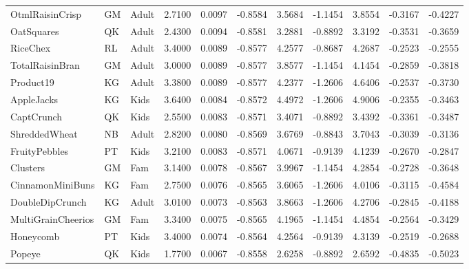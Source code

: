 \begin{table}[!htbp]
\begin{tabular}{lllrrrrrrrr}
OtmlRaisinCrisp & GM & Adult & 2.7100 & 0.0097 & -0.8584 & 3.5684 & -1.1454 & 3.8554 & -0.3167 & -0.4227 \\
OatSquares & QK & Adult & 2.4300 & 0.0094 & -0.8581 & 3.2881 & -0.8892 & 3.3192 & -0.3531 & -0.3659 \\
RiceChex & RL & Adult & 3.4000 & 0.0089 & -0.8577 & 4.2577 & -0.8687 & 4.2687 & -0.2523 & -0.2555 \\
TotalRaisinBran & GM & Adult & 3.0000 & 0.0089 & -0.8577 & 3.8577 & -1.1454 & 4.1454 & -0.2859 & -0.3818 \\
Product19 & KG & Adult & 3.3800 & 0.0089 & -0.8577 & 4.2377 & -1.2606 & 4.6406 & -0.2537 & -0.3730 \\
AppleJacks & KG & Kids & 3.6400 & 0.0084 & -0.8572 & 4.4972 & -1.2606 & 4.9006 & -0.2355 & -0.3463 \\
CaptCrunch & QK & Kids & 2.5500 & 0.0083 & -0.8571 & 3.4071 & -0.8892 & 3.4392 & -0.3361 & -0.3487 \\
ShreddedWheat & NB & Adult & 2.8200 & 0.0080 & -0.8569 & 3.6769 & -0.8843 & 3.7043 & -0.3039 & -0.3136 \\
FruityPebbles & PT & Kids & 3.2100 & 0.0083 & -0.8571 & 4.0671 & -0.9139 & 4.1239 & -0.2670 & -0.2847 \\
Clusters & GM & Fam & 3.1400 & 0.0078 & -0.8567 & 3.9967 & -1.1454 & 4.2854 & -0.2728 & -0.3648 \\
CinnamonMiniBuns & KG & Fam & 2.7500 & 0.0076 & -0.8565 & 3.6065 & -1.2606 & 4.0106 & -0.3115 & -0.4584 \\
DoubleDipCrunch & KG & Adult & 3.0100 & 0.0073 & -0.8563 & 3.8663 & -1.2606 & 4.2706 & -0.2845 & -0.4188 \\
MultiGrainCheerios & GM & Fam & 3.3400 & 0.0075 & -0.8565 & 4.1965 & -1.1454 & 4.4854 & -0.2564 & -0.3429 \\
Honeycomb & PT & Kids & 3.4000 & 0.0074 & -0.8564 & 4.2564 & -0.9139 & 4.3139 & -0.2519 & -0.2688 \\
Popeye & QK & Kids & 1.7700 & 0.0067 & -0.8558 & 2.6258 & -0.8892 & 2.6592 & -0.4835 & -0.5023 \\
\bottomrule
\end{tabular}

\end{table}
